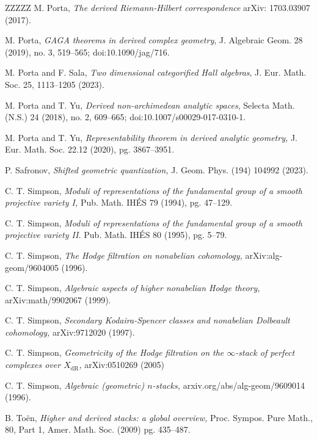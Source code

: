 \documentclass[11pt, a4paper]{amsart}
\numberwithin{equation}{section}
\theoremstyle{definition}
\theoremstyle{remark}
\DeclareMathOperator{\dR}{dR}
\begin{document}
\begin{thebibliography}{ZZZZZ}
M. Porta,
\textit{The derived Riemann-Hilbert correspondence} 
arXiv: 1703.03907 (2017).

 M. Porta, {\it GAGA theorems in derived complex geometry}, J. Algebraic Geom. 28 (2019), no. 3, 519--565; doi:10.1090/jag/716.

M. Porta and F. Sala,
\textit{Two dimensional categorified Hall algebras},
J. Eur. Math. Soc. 25, 1113--1205 (2023).

 M. Porta and T. Yu, {\it Derived non-archimedean analytic spaces}, Selecta Math. (N.S.) 24 (2018), no. 2, 609--665; doi:10.1007/s00029-017-0310-1.

M. Porta and T. Yu, 
\textit{Representability theorem in derived analytic geometry,}
J. Eur. Math. Soc. 22.12 (2020), pg. 3867--3951.

P. Safronov,
\textit{Shifted geometric quantization,}
J. Geom. Phys. (194) 104992 (2023).

C. T. Simpson,
\textit{Moduli of representations of the fundamental group of a smooth projective variety I,}
Pub. Math. IHÉS 79 (1994), pg. 47--129.

C. T. Simpson,
\textit{Moduli of representations of the fundamental group of a smooth projective variety II.}
Pub. Math. IHÉS 80 (1995),  pg. 5--79.

C. T. Simpson,
\textit{The Hodge filtration on nonabelian cohomology,}
arXiv:alg-geom/9604005 (1996).

C. T. Simpson,
\textit{Algebraic aspects of higher nonabelian Hodge theory,} 
arXiv:math/9902067 (1999).

C. T. Simpson, 
\textit{Secondary Kodaira-Spencer classes and nonabelian Dolbeault cohomology,} 
arXiv:9712020 (1997).

C. T. Simpson,
\textit{Geometricity of the Hodge filtration on the $\infty$-stack of perfect complexes over $X_{\dR}$,}
arXiv:0510269 (2005)

C. T. Simpson,
\textit{Algebraic (geometric) $n$-stacks,}
arxiv.org/abs/alg-geom/9609014 (1996).

B. To\"en,
{ \it Higher and derived stacks: a global overview,}
Proc. Sympos. Pure Math., 80, Part 1, Amer. Math. Soc. (2009) pg. 435--487.


\end{thebibliography}
\end{document}

